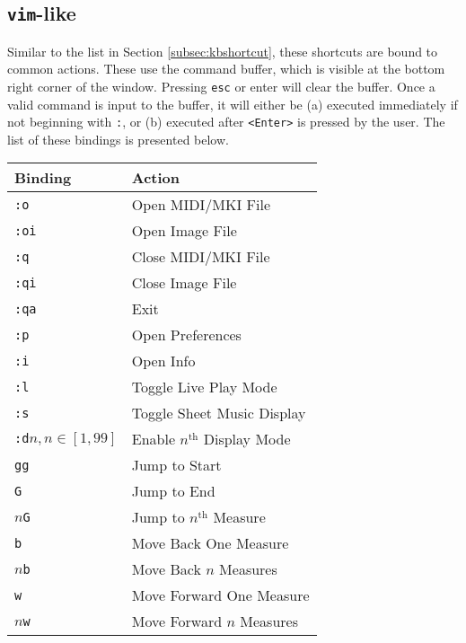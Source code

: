 \documentclass[english]{article}
\makeatletter
\newenvironment{restoretext}%
    {\@parboxrestore%
     \begin{adjustwidth}{}{\leftmargin}%
    }{\end{adjustwidth}
     }
\def\rcbegin{\begin{restoretext}\centering}
\def\rcend{\end{restoretext}}
\providecommand{\mi}[1]{\texttt{#1}}
\makeatother
\begin{document}
\newpage

\subsection{\mi{vim}-like}

Similar to the list in Section \textcolor{lcol}{\hyperref[subsec:kbshortcut]{\ref{subsec:kbshortcut}}}, these shortcuts are bound to common actions. These use the command 
buffer, which is visible at the bottom right corner of the window. Pressing \mi{esc} or enter will clear the buffer. Once a 
valid command is input to the buffer, it will either be (a) executed immediately if not beginning with \mi{:}, or 
(b) executed after \mi{<Enter>} is pressed by the user. The list of these bindings is presented below. 

\vspace{1em}

\rcbegin
\begin{tabular}{|l|l|}
  \hline
  \textbf{Binding}                 												& \textbf{Action} \\
  \hline
  \mi{:o}       					 														    & Open MIDI/MKI File \\
  \mi{:oi} 					 														          & Open Image File \\
  \mi{:q}       					 														    & Close MIDI/MKI File \\
  \mi{:qi} 					 														          & Close Image File \\
  \mi{:qa} 					 														          & Exit \\
  \mi{:p}       					 														    & Open Preferences \\
  \mi{:i}       					 														    & Open Info \\
  \mi{:l}   					 														        & Toggle Live Play Mode \\
  \mi{:s}   					 														        & Toggle Sheet Music Display \\
  \mi{:d}$n, n \in [1,99]$   														  & Enable $n^\text{th}$ Display Mode\\
  \mi{gg}   					 														        & Jump to Start \\
  \mi{G}   					 														          & Jump to End \\
  $n$\mi{G}       			                                  & Jump to $n^\text{th}$ Measure \\
  \mi{b}       			                                      & Move Back One Measure \\
  $n$\mi{b}       			                                  & Move Back $n$ Measures \\
  \mi{w}       			                                      & Move Forward One Measure \\
  $n$\mi{w}       			                                  & Move Forward $n$ Measures \\
  \hline
\end{tabular}
\rcend
\end{document}

